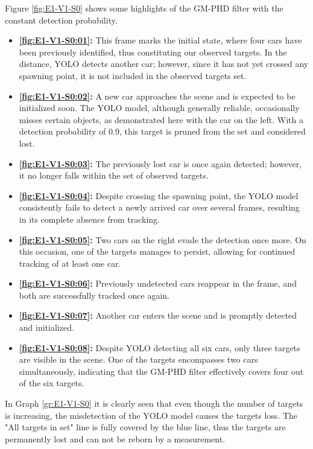 Figure \ref{fig:E1-V1-S0} shows some highlights of the GM-PHD filter with the constant detection probability.
\begin{itemize}
    \item \textbf{\ref{fig:E1-V1-S0:01}:} This frame marks the initial state, where four cars have been previously identified, thus constituting our observed targets. In the distance, YOLO detects another car; however, since it has not yet crossed any spawning point, it is not included in the observed targets set.
    \item \textbf{\ref{fig:E1-V1-S0:02}:} A new car approaches the scene and is expected to be initialized soon. The YOLO model, although generally reliable, occasionally misses certain objects, as demonstrated here with the car on the left. With a detection probability of 0.9, this target is pruned from the set and considered lost.
    \item \textbf{\ref{fig:E1-V1-S0:03}:} The previously lost car is once again detected; however, it no longer falls within the set of observed targets.
    \item \textbf{\ref{fig:E1-V1-S0:04}:} Despite crossing the spawning point, the YOLO model consistently fails to detect a newly arrived car over several frames, resulting in its complete absence from tracking.
    \item \textbf{\ref{fig:E1-V1-S0:05}:} Two cars on the right evade the detection once more. On this occasion, one
    of the targets manages to persist, allowing for continued tracking of at least one car.
    \item \textbf{\ref{fig:E1-V1-S0:06}:} Previously undetected cars reappear in the frame, and both are successfully tracked once again.
    \item \textbf{\ref{fig:E1-V1-S0:07}:} Another car enters the scene and is promptly detected and initialized.
    \item \textbf{\ref{fig:E1-V1-S0:08}:} Despite YOLO detecting all six cars, only three targets are visible in the scene. One of the targets encompasses two cars simultaneously, indicating that the GM-PHD filter effectively covers four out of the six targets.
\end{itemize}

In Graph \ref{gr:E1-V1-S0} it is clearly seen that even though the number of targets is increasing, the misdetection
of the YOLO model causes the targets loss. The "All targets in set" line is fully covered by the blue line, thus the
targets are permanently lost and can not be reborn by a measurement.

